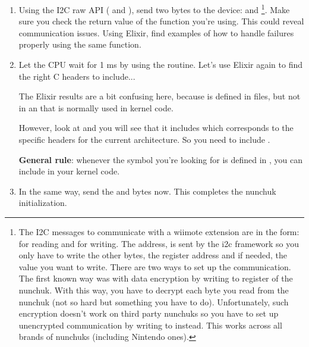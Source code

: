 \begin{enumerate}
\item Using the I2C raw API ( and
        ), send two bytes to the
        device:  and \footnote{
	The I2C messages to communicate with a wiimote
        extension are in the form: 
        for reading and  for
        writing. The address,  is sent by the i2c framework
        so you only have to write the other bytes, the register
        address and if needed, the value you want to write. There are
        two ways to set up the communication. The first known way was
        with data encryption by writing  to register
         of the nunchuk.  With this way, you have to
        decrypt each byte you read from the nunchuk (not so hard but
        something you have to do).  Unfortunately, such encryption
        doesn't work on third party nunchuks so you have to set up
        unencrypted communication by writing  to
         instead. This works across all brands of nunchuks
        (including Nintendo ones).}.
      Make sure you check the return value of the function you're
      using. This could reveal communication issues.  Using Elixir, find
      examples of how to handle failures properly using the same
      function.

\item Let the CPU wait for 1 ms by using the  routine.
      Let's use Elixir again to find the right C headers to include...

      The Elixir results are a bit confusing here, because
       is defined in  files,
      but not in an  that is normally used
      in kernel code.

      However, look at  and you will see
      that it includes  which corresponds to the
      specific headers for the current architecture. So you need to include
      .

      {\bf General rule}: whenever the symbol you're looking
      for is defined in , you
      can include  in your kernel code.

\item In the same way, send the  and  bytes now.
      This completes the nunchuk initialization.
\end{enumerate}

